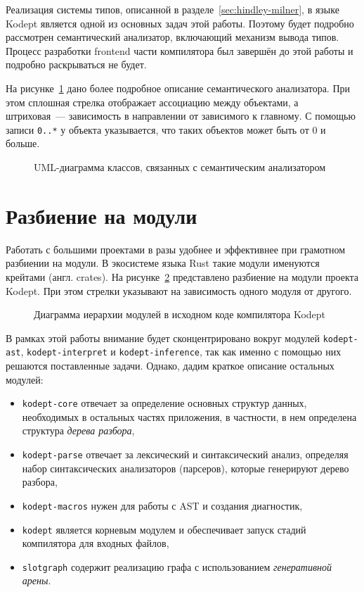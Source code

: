 Реализация системы типов, описанной в разделе~\ref{sec:hindley-milner}, в языке Kodept является одной из основных задач этой работы.
Поэтому будет подробно рассмотрен семантический анализатор, включающий механизм вывода типов.
Процесс разработки frontend части компилятора был завершён до этой работы и подробно раскрываться не будет.

На рисунке~\ref{fig:semantic_classes} дано более подробное описание семантического анализатора.
При этом сплошная стрелка отображает ассоциацию между объектами, а штриховая~--- зависимость в направлении от зависимого к главному.
С помощью записи \lstinline{0..*} у объекта указывается, что таких объектов может быть от 0 и больше.

\begin{figure}[h]
    \centering
    
    \caption{UML-диаграмма классов, связанных с семантическим анализатором}
    \label{fig:semantic_classes}
\end{figure}


\section{Разбиение на модули}
\label{sec:modules}

Работать с большими проектами в разы удобнее и эффективнее при грамотном разбиении на модули.
В экосистеме языка Rust такие модули именуются крейтами (англ. crates).
На рисунке~\ref{fig:modules} представлено разбиение на модули проекта Kodept.
При этом стрелки указывают на зависимость одного модуля от другого.

\begin{figure}[H]
    \centering
    
    \caption{Диаграмма иерархии модулей в исходном коде компилятора Kodept}
    \label{fig:modules}
\end{figure}

В рамках этой работы внимание будет сконцентрировано вокруг модулей \lstinline{kodept-ast}, \lstinline{kodept-interpret} и \lstinline{kodept-inference}, так как именно с помощью них решаются поставленные задачи.
Однако, дадим краткое описание остальных модулей:
\begin{itemize}
    \item \lstinline{kodept-core} отвечает за определение основных структур данных, необходимых в остальных частях приложения, в частности, в нем определена структура \textit{дерева разбора},
    \item \lstinline{kodept-parse} отвечает за лексический и синтаксический анализ, определяя набор синтаксических анализаторов (парсеров), которые генерируют дерево разбора,
    \item \lstinline{kodept-macros} нужен для работы с AST и создания диагностик,
    \item \lstinline{kodept} является корневым модулем и обеспечивает запуск стадий компилятора для входных файлов,
    \item \lstinline{slotgraph} содержит реализацию графа с использованием \textit{генеративной арены}.
\end{itemize}

